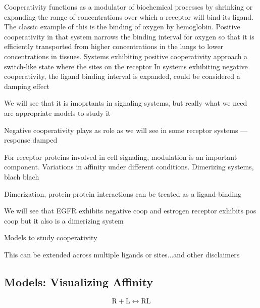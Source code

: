 \documentclass{article}
\numberwithin{equation}{section}
\begin{document}
Cooperativity functions as a modulator of biochemical processes by shrinking or expanding the range of concentrations over which a receptor will bind its ligand. The classic example of this is the binding of oxygen by hemoglobin. Positive cooperativity in that system narrows the binding interval for oxygen so that it is efficiently transported from higher concentrations in the lungs to lower concentrations in tissues. Systems exhibiting positive cooperativity approach a switch-like state where the sites on the receptor   In systems exhibiting negative cooperativity, the ligand binding interval is expanded, could be considered a damping effect

We will see that it is imoprtants in signaling systems, but really what we need are appropriate models to study it



Negative cooperativity plays as role as we will see in some receptor systems --- response damped


For receptor proteins involved in cell signaling, modulation is an important component. Variations in affinity under different conditions. Dimerizing systems, blach blach

Dimerization, protein-protein interactions can be treated as a ligand-binding

We will see that EGFR exhibits negative coop and estrogen receptor exhibits pos coop but it also is a dimerizing system

Models to study cooperativity

This can be extended across multiple ligands or sites...and other disclaimers

\subsection*{Models: Visualizing Affinity}

\begin{equation}
	\text{R} + \text{L} \leftrightarrow \text{RL}
	\end{equation}
 
\end{document}
